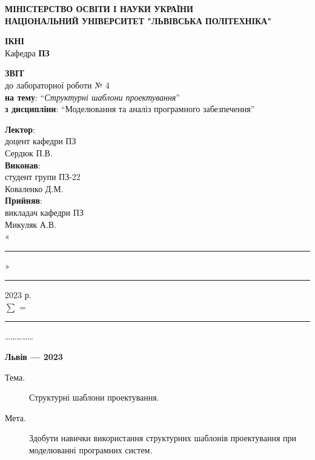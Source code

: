 \documentclass[oneside,14pt]{extarticle}
\newcommand\subject{Моделювання та аналіз програмного забезпечення}
\newcommand\lecturer{доцент кафедри ПЗ \\ Сердюк П.В.}
\newcommand\teacher{викладач кафедри ПЗ \\ Микуляк А.В.}
\newcommand\mygroup{ПЗ-22}
\newcommand\lab{4}
\newcommand\theme{Структурні шаблони проектування}
\newcommand\purpose{Здобути навички використання структурних шаблонів проектування при моделюванні програмних систем}
\begin{document}
\begin{normalsize}
	\begin{titlepage}
		\thispagestyle{empty}
		\begin{center}
			\textbf{МІНІСТЕРСТВО ОСВІТИ І НАУКИ УКРАЇНИ\\
				НАЦІОНАЛЬНИЙ УНІВЕРСИТЕТ "ЛЬВІВСЬКА ПОЛІТЕХНІКА"}
		\end{center}
		\begin{flushright}
			\textbf{ІКНІ}\\
			Кафедра \textbf{ПЗ}
		\end{flushright}
		\vspace{70pt}
		\begin{center}
			\textbf{ЗВІТ}\\
			\vspace{10pt}
			до лабораторної роботи № \lab\\
			\textbf{на тему}: “\textit{\theme}”\\
			\textbf{з дисципліни}: “\subject”
		\end{center}
		\vspace{50pt}
		\begin{flushright}
			
			\textbf{Лектор}:\\
			\lecturer\\
			\vspace{10pt}
			\textbf{Виконав}:\\
			
			студент групи \mygroup\\
			Коваленко Д.М.\\
			\vspace{10pt}
			\textbf{Прийняв}:\\
			
			\teacher\\
			
			\vspace{28pt}
			«\rule{1cm}{0.15mm}» \rule{1.5cm}{0.15mm} 2023 р.\\
			$\sum$ = \rule{1cm}{0.15mm}……………\\
			
		\end{flushright}
		\vspace{\fill}
		\begin{center}
			\textbf{Львів — 2023}
		\end{center}
	\end{titlepage}
		
	\begin{description}
		\item[Тема.] \theme.
		\item[Мета.] \purpose.
	\end{description}


\end{normalsize}
\end{document}
